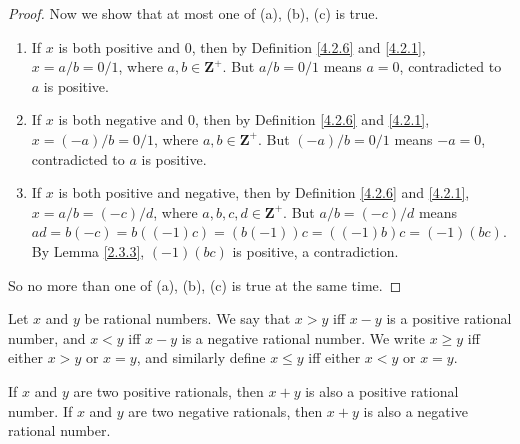 \begin{proof}
    Now we show that at most one of (a), (b), (c) is true.
    \begin{enumerate}[label=(\Roman*)]
        \item If \(x\) is both positive and \(0\), then by Definition \ref{4.2.6} and \ref{4.2.1}, \(x = a / b = 0 / 1\), where \(a, b \in \mathbf{Z}^+\).
              But \(a / b = 0 / 1\) means \(a = 0\), contradicted to \(a\) is positive.
        \item If \(x\) is both negative and \(0\), then by Definition \ref{4.2.6} and \ref{4.2.1}, \(x = (-a) / b = 0 / 1\), where \(a, b \in \mathbf{Z}^+\).
              But \((-a) / b = 0 / 1\) means \(-a = 0\), contradicted to \(a\) is positive.
        \item If \(x\) is both positive and negative, then by Definition \ref{4.2.6} and \ref{4.2.1}, \(x = a / b = (-c) / d\), where \(a, b, c, d \in \mathbf{Z}^+\).
              But \(a / b = (-c) / d\) means \(ad = b(-c) = b((-1)c) = (b(-1))c = ((-1)b)c = (-1)(bc)\).
              By Lemma \ref{2.3.3}, \((-1)(bc)\) is positive, a contradiction.
    \end{enumerate}
    So no more than one of (a), (b), (c) is true at the same time.
\end{proof}

\begin{definition}\label{4.2.8}
    Let \(x\) and \(y\) be rational numbers.
    We say that \(x > y\) iff \(x - y\) is a positive rational number, and \(x < y\) iff \(x - y\) is a negative rational number.
    We write \(x \geq y\) iff either \(x > y\) or \(x = y\), and similarly define \(x \leq y\) iff either \(x < y\) or \(x = y\).
\end{definition}

\begin{additional corollary}\label{ac 4.2.4}
If \(x\) and \(y\) are two positive rationals, then \(x + y\) is also a positive rational number.
If \(x\) and \(y\) are two negative rationals, then \(x + y\) is also a negative rational number.
\end{additional corollary}

